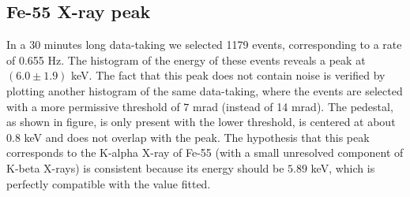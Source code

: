 \documentclass[12pt]{article}
\begin{document}
\subsection{Fe-55 X-ray peak}
In a 30 minutes long data-taking we selected 1179 events, corresponding to a rate of 0.655 Hz. The histogram of the energy of these events reveals a peak at $(6.0 \pm 1.9)$ keV. The fact that this peak does not contain noise is verified by plotting another histogram of the same data-taking, where the events are selected with a more permissive threshold of $7$ mrad (instead of 14 mrad). The pedestal, as shown in figure, is only present with the lower threshold, is centered at about $0.8$ keV and does not overlap with the peak. The hypothesis that this peak corresponds to the K-alpha X-ray of Fe-55 (with a small unresolved component of K-beta X-rays) is consistent because its energy should be $5.89$ keV, which is perfectly compatible with the value fitted.
\end{document}
